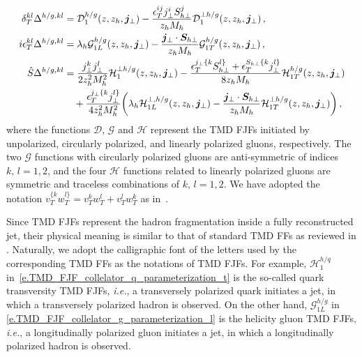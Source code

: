 \documentclass[a4paper, 11 pt]{article}
\begin{document}
\begin{align}
\delta _T^{kl} \Delta ^{h/g, kl}
& =
\mathcal{D}_1^{h/g} (z, z_h, \boldsymbol{j}_{\perp})
-
\frac{\epsilon ^{ij}_T j_{\perp}^i S_{h \perp}^j}{z_h M_h} \mathcal{D}_1^{\perp h/g} (z, z_h, \boldsymbol{j}_{\perp})
\label{e.TMD_FJF_collelator_g_parameterization_u}
\, , \\
i \epsilon _T^{kl} \Delta ^{h/g, kl}
& =
\lambda_h \mathcal{G}_{1L}^{h/g} (z, z_h, \boldsymbol{j}_{\perp})
-
\frac{\boldsymbol{j}_{\perp} \cdot \boldsymbol{S}_{h \perp}}{z_h M_h} \mathcal{G}_{1T}^{h/g} (z, z_h, \boldsymbol{j}_{\perp})
\label{e.TMD_FJF_collelator_g_parameterization_l}
\, , \\
\hat{S} \Delta ^{h/g, kl}
& =
\frac{j_{\perp}^k j_{\perp}^l}{2 z_h^2 M_h^2} \mathcal{H}_1^{\perp h/g} (z, z_h, \boldsymbol{j}_{\perp})
-
\frac{\epsilon_T^{j_{\perp}\{k} S_{h \perp}^{l\}} + \epsilon_T^{S_{h\perp}\{k} j_{\perp}^{l\}}}{8 z_h M_h} \mathcal{H}_{1T}^{h/g} (z, z_h, \boldsymbol{j}_{\perp})
\nonumber \\
& \quad +
\frac{\epsilon_T^{j_{\perp}\{k} j_{\perp}^{l\}}}{4 z_h^2 M_h^2}
\pqty{
\lambda_h \mathcal{H}_{1L}^{\perp, h/g} (z, z_h, \boldsymbol{j}_{\perp})
-
\frac{\boldsymbol{j}_{\perp} \cdot \boldsymbol{S}_{h \perp}}{z_h M_h} \mathcal{H}_{1T}^{\perp h/g} (z, z_h, \boldsymbol{j}_{\perp})
} \, ,\label{e.TMD_FJF_collelator_g_parameterization_t}
\end{align}
where the functions $\mathcal{D}$, $\mathcal{G}$ and $\mathcal{H}$ represent the TMD FJFs initiated by unpolarized, circularly polarized, and linearly polarized gluons, respectively. The two $\mathcal{G}$ functions with circularly polarized gluons are anti-symmetric of indices $k,\, l= 1, 2$, and the four $\mathcal{H}$ functions related to linearly polarized gluons are symmetric and traceless combinations of $k,\, l= 1, 2$. 
We have adopted the notation $v_T^{\{k}w_T^{l\}} = v_T^k w_T^l + v_T^l w_T^k$ as in~\cite{Mulders:2000sh, Boussarie:2023izj}. 

Since TMD FJFs represent the hadron fragmentation inside a fully reconstructed jet, their physical meaning is similar to that of standard TMD FFs as reviewed in \cite{Metz:2016swz}. Naturally, we adopt the calligraphic font of the letters used by the corresponding TMD FFs as the notations of TMD FJFs. For example, $\mathcal{H}_{1}^{h/q}$ in~\cref{e.TMD_FJF_collelator_q_parameterization_t} is the so-called quark transversity TMD FJFs, \textit{i.e.}, a transversely polarized quark initiates a jet, in which a transversely polarized hadron is observed.
On the other hand, $\mathcal{G}_{1L}^{h/g}$ in \cref{e.TMD_FJF_collelator_g_parameterization_l} is the helicity gluon TMD FJFs, \textit{i.e.}, a longitudinally polarized gluon initiates a jet, in which a longitudinally polarized hadron is observed.
\end{document}
